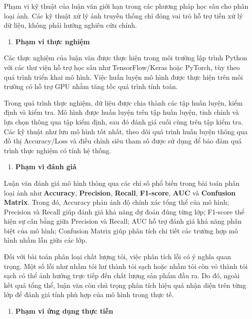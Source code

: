 \documentclass[
]{article}
\begin{document}
Phạm vi kỹ thuật của luận văn giới hạn trong các phương pháp học sâu cho
phân loại ảnh. Các kỹ thuật xử lý ảnh truyền thống chỉ đóng vai trò hỗ
trợ tiền xử lý dữ liệu, không phải hướng nghiên cứu chính.

\begin{enumerate}
\def\labelenumi{\alph{enumi}.}
\setcounter{enumi}{3}
\item
  \textbf{Phạm vi thực nghiệm}
\end{enumerate}

Các thực nghiệm của luận văn được thực hiện trong môi trường lập trình
Python với các thư viện hỗ trợ học sâu như TensorFlow/Keras hoặc
PyTorch, tùy theo quá trình triển khai mô hình. Việc huấn luyện mô hình
được thực hiện trên môi trường có hỗ trợ GPU nhằm tăng tốc quá trình
tính toán.

Trong quá trình thực nghiệm, dữ liệu được chia thành các tập huấn luyện,
kiểm định và kiểm tra. Mô hình được huấn luyện trên tập huấn luyện, tinh
chỉnh và lựa chọn thông qua tập kiểm định, sau đó đánh giá cuối cùng
trên tập kiểm tra. Các kỹ thuật như lưu mô hình tốt nhất, theo dõi quá
trình huấn luyện thông qua đồ thị Accuracy/Loss và điều chỉnh siêu tham
số được sử dụng để bảo đảm quá trình thực nghiệm có tính hệ thống.

\begin{enumerate}
\def\labelenumi{\alph{enumi}.}
\setcounter{enumi}{4}
\item
  \textbf{Phạm vi đánh giá}
\end{enumerate}

Luận văn đánh giá mô hình thông qua các chỉ số phổ biến trong bài toán
phân loại ảnh như \textbf{Accuracy}, \textbf{Precision},
\textbf{Recall}, \textbf{F1-score}, \textbf{AUC} và \textbf{Confusion
Matrix}. Trong đó, Accuracy phản ánh độ chính xác tổng thể của mô hình;
Precision và Recall giúp đánh giá khả năng dự đoán đúng từng lớp;
F1-score thể hiện sự cân bằng giữa Precision và Recall; AUC hỗ trợ đánh
giá khả năng phân biệt của mô hình; Confusion Matrix giúp phân tích chi
tiết các trường hợp mô hình nhầm lẫn giữa các lớp.

Đối với bài toán phân loại chất lượng tỏi, việc phân tích lỗi có ý nghĩa
quan trọng. Một số lỗi như nhầm tỏi hư thành tỏi sạch hoặc nhầm tỏi còn
vỏ thành tỏi sạch có thể ảnh hưởng trực tiếp đến chất lượng sản phẩm đầu
ra. Do đó, ngoài kết quả tổng thể, luận văn còn chú trọng phân tích hiệu
quả nhận diện trên từng lớp để đánh giá tính phù hợp của mô hình trong
thực tế.

\begin{enumerate}
\def\labelenumi{\alph{enumi}.}
\setcounter{enumi}{5}
\item
  \textbf{Phạm vi ứng dụng thực tiễn}
\end{enumerate}
\end{document}
